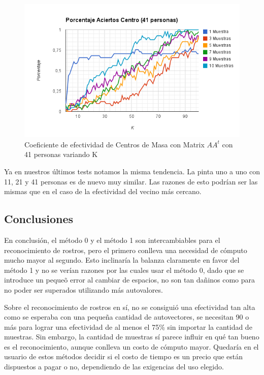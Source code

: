 \begin{figure}[H] \includegraphics[width=1\textwidth]{img/imagef15.png} \caption{Coeficiente de
    efectividad de Centros de Masa  con Matrix $AA^t$ con 41 personas variando K} \end{figure}


Ya en nuestros últimos tests notamos la misma tendencia. La pinta uno a uno con 11, 21 y 41 personas
es de nuevo muy similar. Las razones de esto podrían ser las mismas que en el caso de la efectividad
del vecino más cercano.


\subsection{Conclusiones}

En conclusión, el método 0 y el método 1 son intercambiables para el reconocimiento de rostros, pero
el primero conlleva una necesidad de cómputo mucho mayor al segundo. Esto inclinaría la balanza
claramente en favor del método 1 y no se verían razones por las cuales usar el método 0, dado que se introduce un peque\~o error al cambiar de espacios, no son tan da\~ninos como para no poder ser superados utilizando m\'as autovalores.

Sobre el reconocimiento de rostros en sí, no se consiguió una efectividad tan alta como se
esperaba con una peque\~na cantidad de autovectores, se necesitan 90 o más para lograr una efectividad de al menos el 75\% sin importar
la cantidad de muestras. Sin embargo, la cantidad de muestras sí parece influir en qué tan bueno es
el reconocimiento, aunque conlleva un costo de cómputo mayor. Quedaría en el usuario de estos
métodos decidir si el costo de tiempo es un precio que están dispuestos a pagar o no, dependiendo de
las exigencias del uso elegido.

